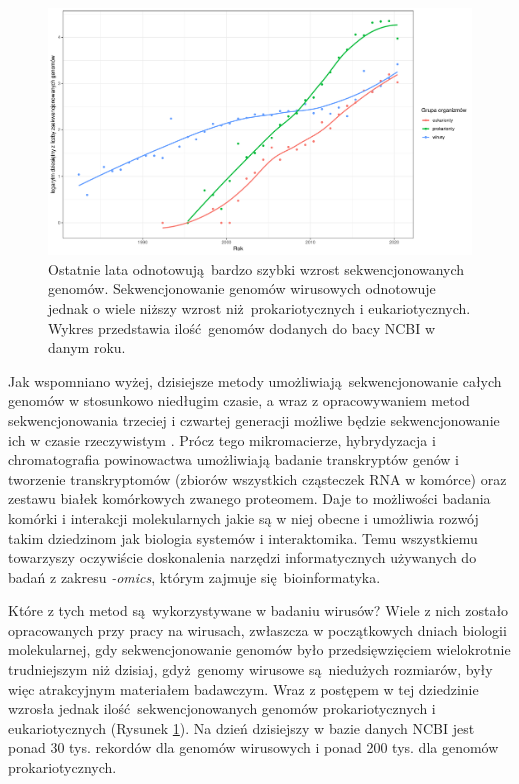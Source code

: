 \documentclass[two column, twoside, a4paper]{article}
\begin{document}
\begin{figure}[h]
\begin{tcolorbox}
	\centering
	\includegraphics[width=\textwidth]{./sequenced_genomes.pdf}
	\caption{Ostatnie lata odnotowują bardzo szybki wzrost sekwencjonowanych genomów. Sekwencjonowanie genomów wirusowych odnotowuje jednak o wiele niższy wzrost niż prokariotycznych i eukariotycznych. Wykres przedstawia ilość genomów dodanych do bacy NCBI \autocite{NCBI} w danym roku.}\label{fig::seq_trends}

\end{tcolorbox}
\end{figure}

Jak wspomniano wyżej, dzisiejsze metody umożliwiają sekwencjonowanie całych genomów w stosunkowo niedługim czasie, a wraz z opracowywaniem metod sekwencjonowania trzeciej i czwartej generacji możliwe będzie sekwencjonowanie ich w czasie rzeczywistym \autocite{Brown2019}. Prócz tego mikromacierze, hybrydyzacja i chromatografia powinowactwa umożliwiają badanie transkryptów genów i tworzenie transkryptomów (zbiorów wszystkich cząsteczek RNA w komórce) oraz zestawu białek komórkowych zwanego proteomem. Daje to możliwości badania komórki i interakcji molekularnych jakie są w niej obecne i umożliwia rozwój takim dziedzinom jak biologia systemów i interaktomika. Temu wszystkiemu towarzyszy oczywiście doskonalenia narzędzi informatycznych używanych do badań z zakresu \textit{-omics}, którym zajmuje się bioinformatyka.

Które z tych metod są wykorzystywane w badaniu wirusów? Wiele z nich zostało opracowanych przy pracy na wirusach, zwłaszcza w początkowych dniach biologii molekularnej, gdy sekwencjonowanie genomów było przedsięwzięciem wielokrotnie trudniejszym niż dzisiaj, gdyż genomy wirusowe są niedużych rozmiarów, były więc atrakcyjnym materiałem badawczym. Wraz z postępem w tej dziedzinie wzrosła jednak ilość sekwencjonowanych genomów prokariotycznych i eukariotycznych (Rysunek \ref{fig::seq_trends}). Na dzień dzisiejszy w bazie danych NCBI jest ponad 30 tys. rekordów dla genomów wirusowych i ponad 200 tys. dla genomów prokariotycznych.
\end{document}
